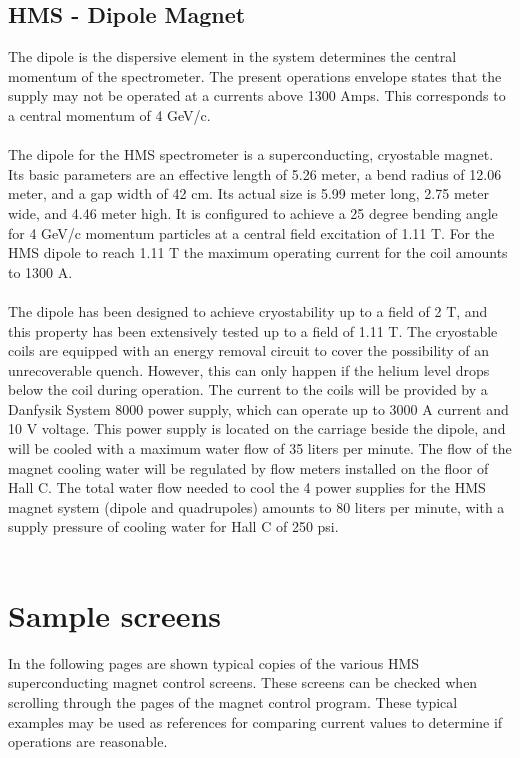 \documentclass[12pt,epsf,here]{article}
\begin{document}
\subsection{HMS - Dipole Magnet}
The dipole is the dispersive element in the system determines the
central momentum of the spectrometer. The present operations envelope
states that the supply may not be operated at a currents above 1300 Amps.
This corresponds to a central momentum of 4 GeV/c.\\
\\
The dipole for the HMS spectrometer is a superconducting, cryostable
magnet. Its basic parameters are an effective length of 5.26 meter, a bend
radius of 12.06 meter, and a gap width of 42 cm. Its actual size is 5.99
meter long, 2.75 meter wide, and 4.46 meter high. It is configured to
achieve a 25 degree bending angle for 4 GeV/c momentum particles at a
central field excitation of 1.11 T. For the HMS dipole to reach 1.11 T the
maximum operating current for the coil amounts to 1300 A.\\ 
\\
The dipole has been designed to achieve cryostability up to a field of 2
T, and this property has been extensively tested up to a field of 1.11 T.
The cryostable coils are equipped with an energy removal circuit to cover
the possibility of an unrecoverable quench. However, this can only happen
if the helium level drops below the coil during operation. The current to
the coils will be provided by a Danfysik System 8000 power supply, which
can operate up to 3000 A current and 10 V voltage. This power supply is
located on the carriage beside the dipole, and will be cooled with a
maximum water flow of 35 liters per minute. The flow of the magnet cooling
water will be regulated by flow meters installed on the floor of Hall C.
The total water flow needed to cool the 4 power supplies for the HMS
magnet system (dipole and quadrupoles) amounts to 80 liters per minute,
with a supply pressure of cooling water for Hall C of 250 psi.\\
\\

\section{Sample screens}

In the following pages are shown typical copies of the various HMS
superconducting magnet control screens.  These screens can be checked when
scrolling through the pages of the magnet control program.  These typical
examples may be used as references for comparing current values to
determine if operations are reasonable. 
\end{document}
